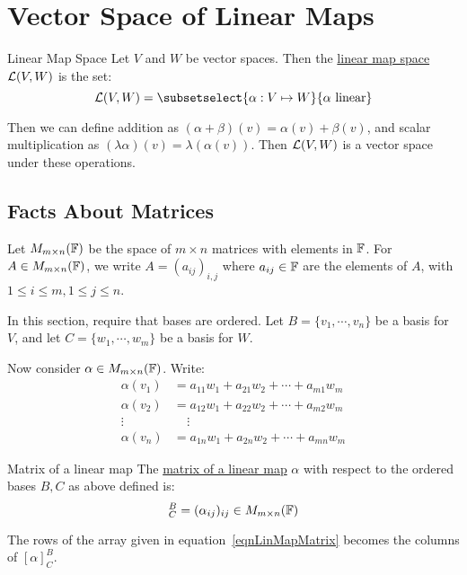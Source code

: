 \documentclass[../Main.tex]{subfiles}
\begin{document}
\section{Vector Space of Linear Maps}
\begin{definition}{Linear Map Space}
    Let $V$ and $W$ be vector spaces. Then the \underline{linear map space} $\mathcal{L}(V, W)$ is the set:
    \begin{equation*}
        \L(V, W) = \subsetselect{\alpha : V \mapsto W}{\alpha \text{ linear}}
    \end{equation*}
\end{definition}
Then we can define addition as $(\alpha + \beta)(v) = \alpha(v) + \beta(v)$, and scalar multiplication as $(\lambda \alpha)(v) = \lambda (\alpha(v))$. Then $\mathcal{L}(V, W)$ is a vector space under these operations.
\subsection{Facts About Matrices}
Let $M_{m \times n}(\mathbb{F})$ be the space of $m \times n$ matrices with elements in $\mathbb{F}$. For $A \in M_{m \times n}(\mathbb{F})$, we write $A = (a_{ij})_{i, j}$ where $a_{ij} \in \mathbb{F}$ are the elements of $A$, with $1 \leq i \leq m, 1 \leq j \leq n$.

In this section, require that bases are ordered. Let $B = \{v_1, \cdots, v_n\}$ be a basis for $V$, and let $C = \{w_1, \cdots, w_m\}$ be a basis for $W$.

Now consider $\alpha \in M_{m \times n}(\mathbb{F})$. Write:
\begin{align}
    \alpha(v_1) &= a_{11}w_1 + a_{21}w_2 + \cdots + a_{m1}w_m \nonumber \\
    \alpha(v_2) &= a_{12}w_1 + a_{22}w_2 + \cdots + a_{m2}w_m \label{eqnLinMapMatrix} \\
    \vdots~&~~~~~\vdots \nonumber \\
    \alpha(v_n) &= a_{1n}w_1 + a_{2n}w_2 + \cdots + a_{mn}w_m \nonumber
\end{align}
\begin{definition}{Matrix of a linear map}
    The \underline{matrix of a linear map} $\alpha$ with respect to the ordered bases $B, C$ as above defined is:
    \begin{equation*}
        [\alpha]_C^B = (\alpha_{ij})_{ij} \in M_{m \times n}(\F)
    \end{equation*}
\end{definition}
\begin{warning}
    The rows of the array given in equation~\ref{eqnLinMapMatrix} becomes the columns of $[\alpha]_{C}^B$.
\end{warning}
\end{document}
